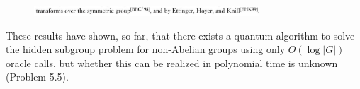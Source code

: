 \begin{figure}
\centering
\includegraphics[width=0.75\textwidth]{Images/2024_05_17_6977ce60de6fd27aef98g-280}
\end{figure}

These results have shown, so far, that there exists a quantum algorithm to solve the hidden subgroup problem for non-Abelian groups using only $O(\log |G|)$ oracle calls, but whether this can be realized in polynomial time is unknown (Problem 5.5).

